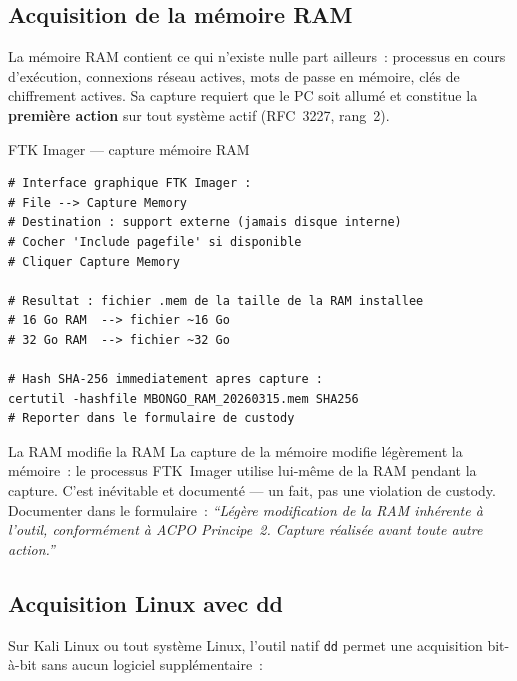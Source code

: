 \subsection{Acquisition de la mémoire RAM}

La mémoire RAM contient ce qui n'existe nulle part ailleurs~: processus
en cours d'exécution, connexions réseau actives, mots de passe en
mémoire, clés de chiffrement actives. Sa capture requiert que le PC soit
allumé et constitue la \textbf{première action} sur tout système actif
(RFC~3227, rang~2).

\begin{boxoutils}{FTK Imager --- capture mémoire RAM}
\begin{lstlisting}[language=bash_forensique]
# Interface graphique FTK Imager :
# File --> Capture Memory
# Destination : support externe (jamais disque interne)
# Cocher 'Include pagefile' si disponible
# Cliquer Capture Memory

# Resultat : fichier .mem de la taille de la RAM installee
# 16 Go RAM  --> fichier ~16 Go
# 32 Go RAM  --> fichier ~32 Go

# Hash SHA-256 immediatement apres capture :
certutil -hashfile MBONGO_RAM_20260315.mem SHA256
# Reporter dans le formulaire de custody
\end{lstlisting}
\end{boxoutils}

\begin{boiteRemarque}{La RAM modifie la RAM}
La capture de la mémoire modifie légèrement la mémoire~: le processus
FTK~Imager utilise lui-même de la RAM pendant la capture. C'est inévitable
et documenté --- un fait, pas une violation de custody. Documenter dans le
formulaire~: \textit{``Légère modification de la RAM inhérente à l'outil,
conformément à ACPO Principe~2. Capture réalisée avant toute autre action.''}
\end{boiteRemarque}

\subsection{Acquisition Linux avec dd}

Sur Kali Linux ou tout système Linux, l'outil natif \texttt{dd} permet une
acquisition bit-à-bit sans aucun logiciel supplémentaire~:

